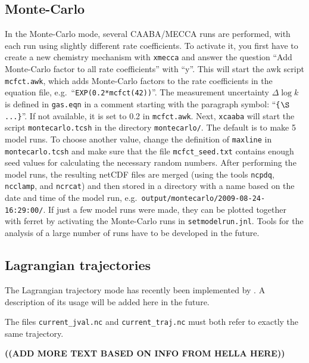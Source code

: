 \documentclass[twoside]{article}
\newcommand{\todo}[1]{{\uppercase{\bf ((#1))}}}
\begin{document}
\subsection{Monte-Carlo}
\label{sec:montecarlo}

In the Monte-Carlo mode, several CAABA/MECCA runs are performed, with
each run using slightly different rate coefficients. To activate it, you
first have to create a new chemistry mechanism with \verb|xmecca| and
answer the question ``Add Monte-Carlo factor to all rate coefficients''
with ``y''. This will start the awk script \verb|mcfct.awk|, which adds
Monte-Carlo factors to the rate coefficients in the equation file, e.g.\
``\verb|EXP(0.2*mcfct(42))|''. The measurement uncertainty $\Delta\log
k$ is defined in \verb|gas.eqn| in a comment starting with the paragraph
symbol: ``\verb|{|$\S$\verb|...}|''. If not available, it is set to 0.2
in \verb|mcfct.awk|. Next, \verb|xcaaba| will start the script
\verb|montecarlo.tcsh| in the directory \verb|montecarlo/|. The default
is to make 5 model runs. To choose another value, change the definition
of \verb|maxline| in \verb|montecarlo.tcsh| and make sure that the file
\verb|mcfct_seed.txt| contains enough seed values for calculating the
necessary random numbers. After performing the model runs, the resulting
netCDF files are merged (using the tools \verb|ncpdq|, \verb|ncclamp|,
and \verb|ncrcat|) and then stored in a directory with a name based on
the date and time of the model run, e.g.\
\verb|output/montecarlo/2009-08-24-16:29:00/|. If just a few model runs
were made, they can be plotted together with ferret by activating the
Monte-Carlo runs in \verb|setmodelrun.jnl|. Tools for the analysis of a
large number of runs have to be developed in the future.

\subsection{Lagrangian trajectories}
\label{sec:lagrangian}

The Lagrangian trajectory mode has recently been implemented by
\citet{2403}. A description of its usage will be added here in the
future.

The files \verb|current_jval.nc| and \verb|current_traj.nc| must both
refer to exactly the same trajectory.

\todo{add more text based on info from hella here}
\end{document}
